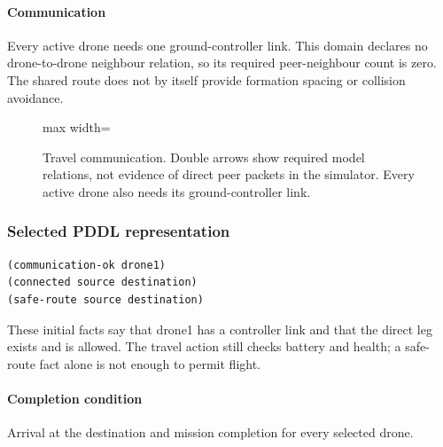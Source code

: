 \documentclass[11pt,a4paper,oneside]{report}
\begin{document}
\paragraph{Communication}
Every active drone needs one ground-controller link. This domain declares no drone-to-drone neighbour relation, so its required peer-neighbour count is zero. The shared route does not by itself provide formation spacing or collision avoidance.

\begin{figure}[H]
\centering
\begin{adjustbox}{max width=\linewidth}
\end{adjustbox}
\caption[Travel communication]{Travel communication. Double arrows show required model
relations, not evidence of direct peer packets in the simulator. Every active drone
also needs its ground-controller link.}
\label{fig:comm-travel}
\end{figure}
\subsubsection*{Selected PDDL representation}
\begin{lstlisting}
(communication-ok drone1)
(connected source destination)
(safe-route source destination)
\end{lstlisting}
These initial facts say that drone1 has a controller link and that the direct leg exists and is allowed. The travel action still checks battery and health; a safe-route fact alone is not enough to permit flight.

\paragraph{Completion condition}
Arrival at the destination and mission completion for every selected drone.
\end{document}

